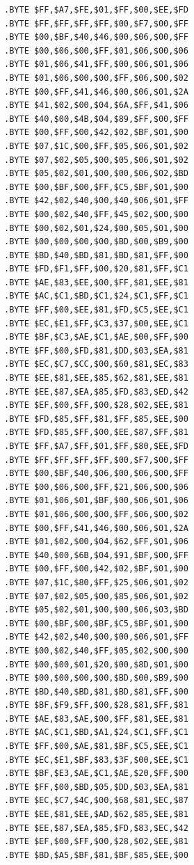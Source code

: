 \begin{minipage}[b]{0.33\linewidth}
\begin{lrbox}{\mybox}%
\begin{lstlisting}[basicstyle=\ttfamily\tiny]
.BYTE $FF,$A7,$FE,$01,$FF,$00,$EE,$FD
.BYTE $FF,$FF,$FF,$FF,$00,$F7,$00,$FF
.BYTE $00,$BF,$40,$46,$00,$06,$00,$FF
.BYTE $00,$06,$00,$FF,$01,$06,$00,$06
.BYTE $01,$06,$41,$FF,$00,$06,$01,$06
.BYTE $01,$06,$00,$00,$FF,$06,$00,$02
.BYTE $00,$FF,$41,$46,$00,$06,$01,$2A
.BYTE $41,$02,$00,$04,$6A,$FF,$41,$06
.BYTE $40,$00,$4B,$04,$89,$FF,$00,$FF
.BYTE $00,$FF,$00,$42,$02,$BF,$01,$00
.BYTE $07,$1C,$00,$FF,$05,$06,$01,$02
.BYTE $07,$02,$05,$00,$05,$06,$01,$02
.BYTE $05,$02,$01,$00,$00,$06,$02,$BD
.BYTE $00,$BF,$00,$FF,$C5,$BF,$01,$00
.BYTE $42,$02,$40,$00,$40,$06,$01,$FF
.BYTE $00,$02,$40,$FF,$45,$02,$00,$00
.BYTE $00,$02,$01,$24,$00,$05,$01,$00
.BYTE $00,$00,$00,$00,$BD,$00,$B9,$00
.BYTE $BD,$40,$BD,$81,$BD,$81,$FF,$00
.BYTE $FD,$F1,$FF,$00,$20,$81,$FF,$C1
.BYTE $AE,$83,$EE,$00,$FF,$81,$EE,$81
.BYTE $AC,$C1,$BD,$C1,$24,$C1,$FF,$C1
.BYTE $FF,$00,$EE,$81,$FD,$C5,$EE,$C1
.BYTE $EC,$E1,$FF,$C3,$37,$00,$EE,$C1
.BYTE $BF,$C3,$AE,$C1,$AE,$00,$FF,$00
.BYTE $FF,$00,$FD,$81,$DD,$03,$EA,$81
.BYTE $EC,$C7,$CC,$00,$60,$81,$EC,$83
.BYTE $EE,$81,$EE,$85,$62,$81,$EE,$81
.BYTE $EE,$87,$EA,$85,$FD,$83,$ED,$42
.BYTE $EF,$00,$FF,$00,$28,$02,$EE,$81
.BYTE $FD,$85,$FF,$81,$FF,$85,$EE,$00
.BYTE $FD,$85,$FF,$00,$EE,$87,$FF,$81
.BYTE $FF,$A7,$FF,$01,$FF,$80,$EE,$FD
.BYTE $FF,$FF,$FF,$FF,$00,$F7,$00,$FF
.BYTE $00,$BF,$40,$06,$00,$06,$00,$FF
.BYTE $00,$06,$00,$FF,$21,$06,$00,$06
.BYTE $01,$06,$01,$BF,$00,$06,$01,$06
.BYTE $01,$06,$00,$00,$FF,$06,$00,$02
.BYTE $00,$FF,$41,$46,$00,$06,$01,$2A
.BYTE $01,$02,$00,$04,$62,$FF,$01,$06
.BYTE $40,$00,$6B,$04,$91,$BF,$00,$FF
.BYTE $00,$FF,$00,$42,$02,$BF,$01,$00
.BYTE $07,$1C,$80,$FF,$25,$06,$01,$02
.BYTE $07,$02,$05,$00,$85,$06,$01,$02
.BYTE $05,$02,$01,$00,$00,$06,$03,$BD
.BYTE $00,$BF,$00,$BF,$C5,$BF,$01,$00
.BYTE $42,$02,$40,$00,$00,$06,$01,$FF
.BYTE $00,$02,$40,$FF,$05,$02,$00,$00
.BYTE $00,$00,$01,$20,$00,$8D,$01,$00
.BYTE $00,$00,$00,$00,$BD,$00,$B9,$00
.BYTE $BD,$40,$BD,$81,$BD,$81,$FF,$00
.BYTE $BF,$F9,$FF,$00,$28,$81,$FF,$81
.BYTE $AE,$83,$AE,$00,$FF,$81,$EE,$81
.BYTE $AC,$C1,$BD,$A1,$24,$C1,$FF,$C1
.BYTE $FF,$00,$AE,$81,$BF,$C5,$EE,$C1
.BYTE $EC,$E1,$BF,$83,$3F,$00,$EE,$C1
.BYTE $BF,$E3,$AE,$C1,$AE,$20,$FF,$00
.BYTE $FF,$00,$BD,$05,$DD,$03,$EA,$81
.BYTE $EC,$C7,$4C,$00,$68,$81,$EC,$87
.BYTE $EE,$81,$EE,$AD,$62,$85,$EE,$81
.BYTE $EE,$87,$EA,$85,$FD,$83,$EC,$42
.BYTE $EF,$00,$FF,$00,$28,$02,$EE,$81
.BYTE $BD,$A5,$BF,$81,$BF,$85,$EE,$00

\end{lstlisting}
\end{lrbox}
\end{minipage}
